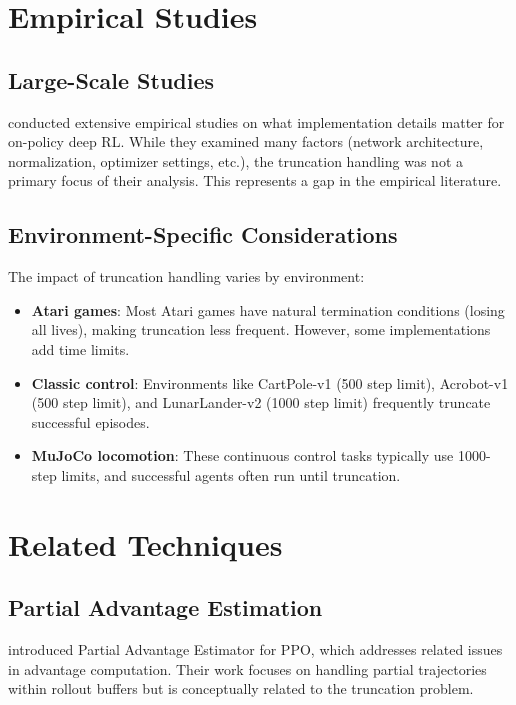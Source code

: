\documentclass[11pt,a4paper]{article}
\begin{document}
\section{Empirical Studies}

\subsection{Large-Scale Studies}

\citet{andrychowicz2020matters,andrychowicz2021matters} conducted extensive empirical studies on what implementation details matter for on-policy deep RL. While they examined many factors (network architecture, normalization, optimizer settings, etc.), the truncation handling was not a primary focus of their analysis. This represents a gap in the empirical literature.

\subsection{Environment-Specific Considerations}

The impact of truncation handling varies by environment:

\begin{itemize}
    \item \textbf{Atari games}: Most Atari games have natural termination conditions (losing all lives), making truncation less frequent. However, some implementations add time limits.
    
    \item \textbf{Classic control}: Environments like CartPole-v1 (500 step limit), Acrobot-v1 (500 step limit), and LunarLander-v2 (1000 step limit) frequently truncate successful episodes.
    
    \item \textbf{MuJoCo locomotion}: These continuous control tasks typically use 1000-step limits, and successful agents often run until truncation.
\end{itemize}

\section{Related Techniques}

\subsection{Partial Advantage Estimation}

\citet{jin2024partial} introduced Partial Advantage Estimator for PPO, which addresses related issues in advantage computation. Their work focuses on handling partial trajectories within rollout buffers but is conceptually related to the truncation problem.
\end{document}
